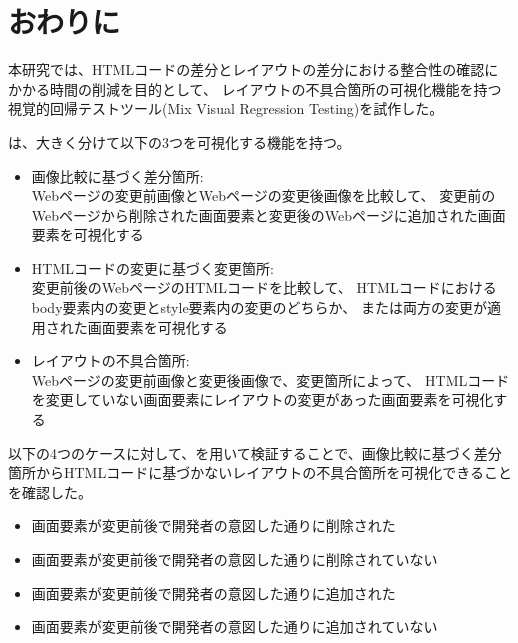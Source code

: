 \chapter{おわりに}\label{cha:Conclusion}
本研究では、HTMLコードの差分とレイアウトの差分における整合性の確認にかかる時間の削減を目的として、
レイアウトの不具合箇所の可視化機能を持つ視覚的回帰テストツール\toolName (Mix Visual Regression Testing)を試作した。
\par
\toolName は、大きく分けて以下の3つを可視化する機能を持つ。
\begin{itemize}
      \item 画像比較に基づく差分箇所:\\
            Webページの変更前画像とWebページの変更後画像を比較して、
            変更前のWebページから削除された画面要素と変更後のWebページに追加された画面要素を可視化する
      \item HTMLコードの変更に基づく変更箇所:\\
            変更前後のWebページのHTMLコードを比較して、
            HTMLコードにおけるbody要素内の変更とstyle要素内の変更のどちらか、
            または両方の変更が適用された画面要素を可視化する
      \item レイアウトの不具合箇所:\\
            Webページの変更前画像と変更後画像で、変更箇所によって、
            HTMLコードを変更していない画面要素にレイアウトの変更があった画面要素を可視化する
\end{itemize}
\par
以下の4つのケースに対して、\toolName を用いて検証することで、画像比較に基づく差分箇所からHTMLコードに基づかないレイアウトの不具合箇所を可視化できることを確認した。
\begin{itemize}
      \item  画面要素が変更前後で開発者の意図した通りに削除された
      \item 画面要素が変更前後で開発者の意図した通りに削除されていない
      \item 画面要素が変更前後で開発者の意図した通りに追加された
      \item 画面要素が変更前後で開発者の意図した通りに追加されていない
\end{itemize}
